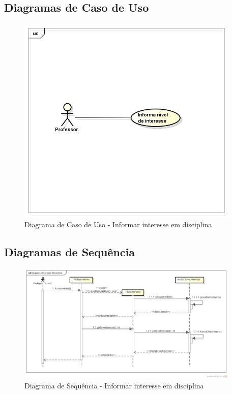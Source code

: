 \documentclass{abnt}
\begin{document}
		\subsection{Diagramas de Caso de Uso}	
		\begin{figure}[h]
			\begin{center}
				 \includegraphics[width=400px]{casoUsoInformarInteresseDisciplina}
				 \caption{Diagrama de Caso de Uso - Informar interesse em disciplina}
			\end{center}
		\end{figure}

		\FloatBarrier
		
		\subsection{Diagramas de Sequência}
		
		\begin{figure}[h]
					\begin{center}
						 \includegraphics[width=400px]{SequenceInteresseDisciplina}
						 \caption{Diagrama de Sequência - Informar interesse em disciplina}
					\end{center}
				\end{figure}
		
\end{document}

